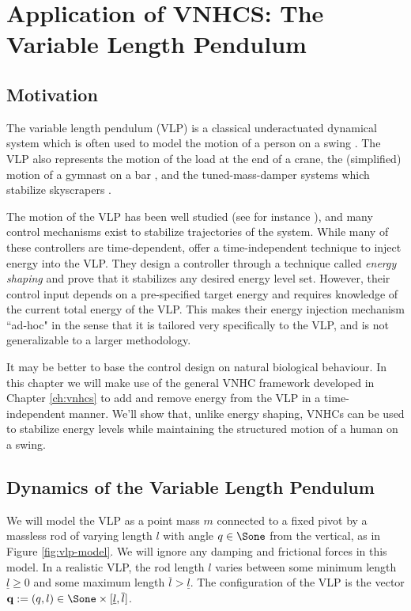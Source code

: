 
\chapter{Application of VNHCS: The Variable Length Pendulum}\label{ch:vlp}
\section{Motivation}
The variable length pendulum (VLP) is a classical underactuated dynamical system
which is often used to model the motion of a person on a swing
\cite{pumping_swing_standing_squatting,how_to_pump_a_swing}.
The VLP also represents the motion of the load at the end of a crane, 
the (simplified) motion of a gymnast on a bar
\cite{pendulum_length_giant_gymnastics}, and the tuned-mass-damper systems which
stabilize skyscrapers \cite{vlp_tuned_mass_damper}.

The motion of the VLP has been well studied (see for instance
\cite{dynamics_periodic_vlp}), and many control mechanisms exist
to stabilize trajectories of the system. While many of these controllers 
are time-dependent, \citet{vlp_energy_shaping}
offer a time-independent technique to inject energy into the VLP. 
They design a controller through a technique called \textit{energy shaping}
and prove that it stabilizes any desired energy level set.
However, their control input depends on a pre-specified target energy and requires
knowledge of the current total energy of the VLP.
This makes their energy injection mechanism ``ad-hoc" in the sense that it is
tailored very specifically to the VLP, and is not generalizable to a larger 
methodology.

It may be better to base the control design on natural biological behaviour.
In this chapter we will make use of the general VNHC framework developed in Chapter
\ref{ch:vnhcs} to add and remove energy from the VLP in a time-independent
manner.
We'll show that, unlike energy shaping, VNHCs can be used to stabilize energy
levels while maintaining the structured motion of a human on a swing.

\section{Dynamics of the Variable Length Pendulum}
We will model the VLP as a point mass \(m\)
connected to a fixed pivot by a massless rod of varying length \(l\) with angle 
\(q \in \Sone\) from the vertical, as in Figure
\ref{fig:vlp-model}. 
We will ignore any damping and frictional forces in this model.
In a realistic VLP, the rod length \(l\) varies between some minimum
length \(\underline{l} \geq 0\) and some maximum length 
\(\overline{l} > \underline{l}\). The configuration of the VLP is the vector
\(\mathbf{q} := (q,l) \in \Sone \times [\underline{l},\overline{l}]\).

